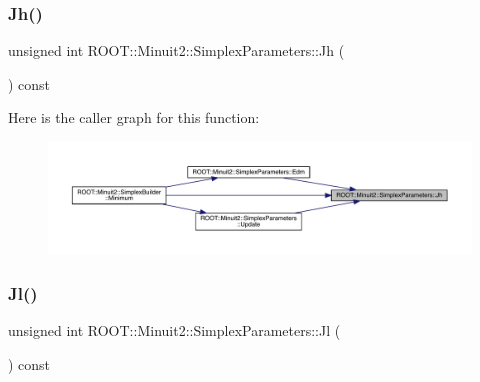 \subsubsection{\texorpdfstring{Jh()}{Jh()}\hspace{0.1cm}{\footnotesize\ttfamily [2/2]}}
{\footnotesize\ttfamily unsigned int R\+O\+O\+T\+::\+Minuit2\+::\+Simplex\+Parameters\+::\+Jh (\begin{DoxyParamCaption}{ }\end{DoxyParamCaption}) const\hspace{0.3cm}{\ttfamily [inline]}}

Here is the caller graph for this function\+:\nopagebreak
\begin{figure}[H]
\begin{center}
\leavevmode
\includegraphics[width=350pt]{d7/da2/classROOT_1_1Minuit2_1_1SimplexParameters_a54250c0d286fcf4d6bbb45df037c7d85_icgraph}
\end{center}
\end{figure}
\mbox{\label{classROOT_1_1Minuit2_1_1SimplexParameters_accfb7ec2b1087661ed3c31dfbb473413}} 
\subsubsection{\texorpdfstring{Jl()}{Jl()}\hspace{0.1cm}{\footnotesize\ttfamily [1/2]}}
{\footnotesize\ttfamily unsigned int R\+O\+O\+T\+::\+Minuit2\+::\+Simplex\+Parameters\+::\+Jl (\begin{DoxyParamCaption}{ }\end{DoxyParamCaption}) const\hspace{0.3cm}{\ttfamily [inline]}}

